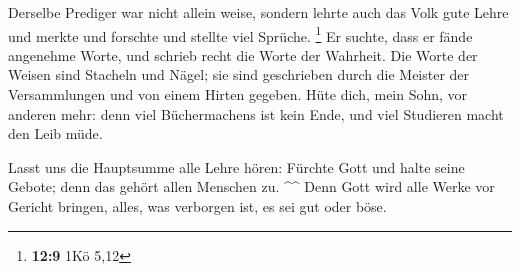  Derselbe Prediger war nicht allein weise, sondern lehrte
auch das Volk gute Lehre und merkte und forschte und stellte viel
Sprüche. \footnote{\textbf{12:9} 1Kö 5,12}  Er suchte,
dass er fände angenehme Worte, und schrieb recht die Worte der Wahrheit.
 Die Worte der Weisen sind Stacheln und Nägel; sie sind
geschrieben durch die Meister der Versammlungen und von einem Hirten
gegeben.  Hüte dich, mein Sohn, vor anderen mehr: denn
viel Büchermachens ist kein Ende, und viel Studieren macht den Leib
müde.

 Lasst uns die Hauptsumme alle Lehre hören: Fürchte Gott
und halte seine Gebote; denn das gehört allen Menschen zu. \^{}\^{}
 Denn Gott wird alle Werke vor Gericht bringen, alles,
was verborgen ist, es sei gut oder böse.
